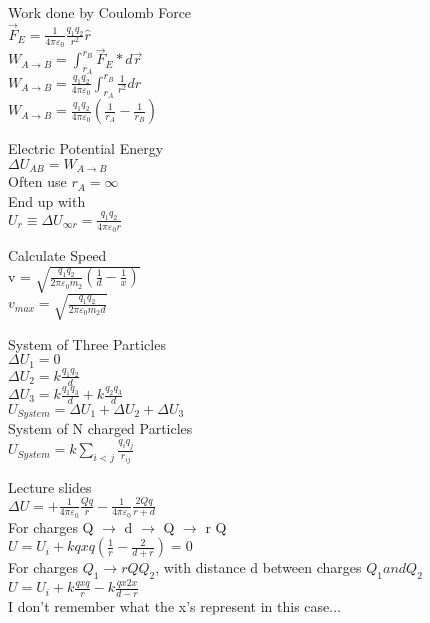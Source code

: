 \documentclass{article}
\begin{document}
\vspace{2mm}

\noindent 
Work done by Coulomb Force \\
$\vec{F}_E = \frac{1}{4 \pi \varepsilon_0} \frac{q_1 q_2}{r^2} \hat{r}$ \\
$W_{A \rightarrow B} = \int_{r_A}^{r_B} \vec{F}_E * d\vec{r}$ \\
$W_{A \rightarrow B} = \frac{q_1 q_2}{4 \pi \varepsilon_0} \int_{r_A}^{r_B} \frac{1}{r^2} dr$ \\
$W_{A \rightarrow B} = \frac{q_1 q_2}{4 \pi \varepsilon_0} (\frac{1}{r_A} - \frac{1}{r_B} )$ 

\vspace {2mm}

\noindent
Electric Potential Energy \\
$\Delta U_{AB} = W_{A \to B}$ \\
Often use $r_A = \infty$ \\
End up with \\
$U_r \equiv \Delta U_{\infty r} = \frac{q_1 q_2}{4 \pi \varepsilon_0 r} $

\vspace{2mm}

\noindent
Calculate Speed \\
v = $\sqrt{\frac{q_1 q_2}{2 \pi \varepsilon_0 m_2}(\frac{1}{d} - \frac{1}{x})}$ \\
$v_{max} = \sqrt{\frac{q_1q_2}{2 \pi \varepsilon_0 m_2 d}} $

\vspace{2mm}

\noindent
System of Three Particles \\
$\Delta U_1 = 0$ \\
$\Delta U_2 = k \frac{q_1 q_2}{d}$ \\
$\Delta U_3 = k \frac{q_1 q_3}{d} + k \frac{q_2 q_3}{d}$ \\
$U_{System} = \Delta U_1 + \Delta U_2 + \Delta U_3$ \\
System of N charged Particles \\
$U_{System} = k \sum^{}_{i<j} \frac{q_i q_j}{r_{ij}} $

\vspace{2mm}

\noindent 
Lecture slides \\
$\Delta U = +\frac{1}{4 \pi \varepsilon_0} \frac{Qq}{r} - \frac{1}{4 \pi \varepsilon_0} \frac{2Qq}{r+d}$ \\
For charges Q $\to$ d $\to$ Q $\to$ r Q \\
$U = U_i + k qxq(\frac{1}{r} - \frac{2}{d+r}) = 0$ \\
For charges $Q_1 \to r Q Q_2$, with distance d between charges $Q_1 and Q_2$ \\
$U = U_i + k\frac{qxq}{r} - k \frac{qx2x}{d-r}$ \\
I don't remember what the x's represent in this case...
\end{document}

